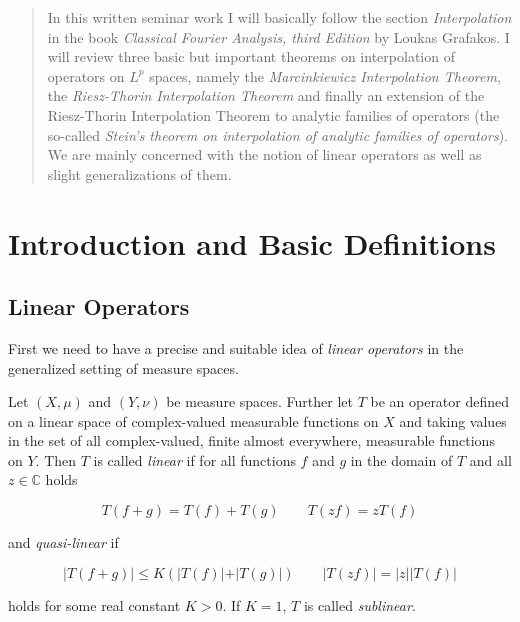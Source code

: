 


\begin{abstract}
	In this written seminar work I will basically follow the section \emph{Interpolation} in the book \emph{Classical Fourier Analysis, third Edition} by Loukas Grafakos. I will review three basic but important theorems on interpolation of operators on $L^p$ spaces, namely the \emph{Marcinkiewicz Interpolation Theorem}, the \emph{Riesz-Thorin Interpolation Theorem} and finally an extension of the Riesz-Thorin Interpolation Theorem to analytic families of operators (the so-called \emph{Stein's theorem on interpolation of analytic families of operators}). We are mainly concerned with the notion of linear operators as well as slight generalizations of them. 
\end{abstract}

\maketitle

\tableofcontents

\mainsectionstyle

\section{Introduction and Basic Definitions}
\subsection{Linear Operators}
First we need to have a precise and suitable idea of \emph{linear operators} in the generalized setting of measure spaces.
\vspace{2mm}
\begin{mdframed}
	\begin{definition}
		Let $(X,\mu)$ and $(Y,\nu)$ be measure spaces. Further let $T$ be an operator defined on a linear space of complex-valued measurable functions on $X$ and taking values in the set of all complex-valued, finite almost everywhere, measurable functions on $Y$. Then $T$ is called \emph{linear} if for all functions $f$ and $g$ in the domain of $T$ and all $z \in \mathbb{C}$ holds

		\begin{equation}
			T\left( f + g \right) = T(f) + T(g) \qquad T\left( zf \right) = zT(f)
			\label{eq:linear}
		\end{equation}

		and \emph{quasi-linear} if

		\begin{equation}
			\vert T\left( f + g \right) \vert \leqslant K \left( \vert T(f)\vert + \vert T(g)\vert \right) \qquad \vert T(zf) \vert = \vert z\vert \vert T(f)\vert
			\label{eq:quasilinear}
		\end{equation}

		holds for some real constant $K > 0$. If $K = 1$, $T$ is called \emph{sublinear}.
	\end{definition}
\end{mdframed}





\originalsectionstyle

\appendix

\printbibliography

\printindex

